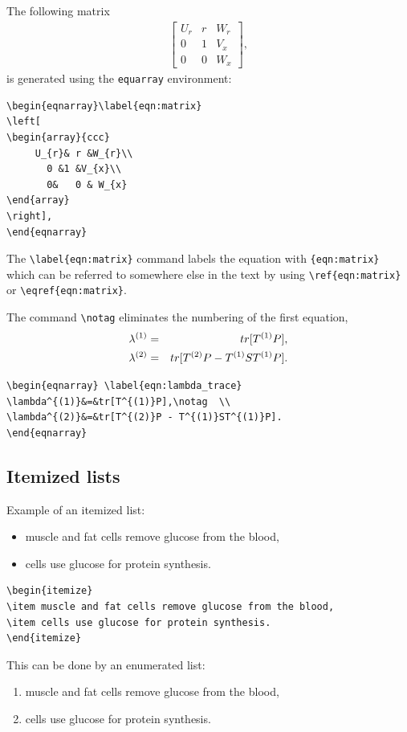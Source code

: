 \documentclass[11pt]{book}
\begin{document}
The following matrix 
\begin{eqnarray}\label{eqn:matrix}
\left[
\begin{array}{ccc}
	 U_{r}&     r       &   W_{r}	\\
	   0       &	1      &  V_{x}	\\
	   0	   &	0      &  W_{x}
\end{array}
\right], 
\end{eqnarray}
is generated using  the \verb+equarray+ environment:
\begin{verbatim}
\begin{eqnarray}\label{eqn:matrix}
\left[
\begin{array}{ccc}
	 U_{r}& r &W_{r}\\
	   0 &1 &V_{x}\\
	   0&	0 & W_{x}
\end{array}
\right], 
\end{eqnarray}
\end{verbatim}
The \verb+\label{eqn:matrix}+ command labels the equation with \verb+{eqn:matrix}+ which can 
be referred  to somewhere else in the text by using \verb+\ref{eqn:matrix}+ or  \verb+\eqref{eqn:matrix}+.


The command \verb+\notag+ eliminates the numbering of the first equation,
\begin{eqnarray} \label{eqn:lambda_trace}
\lambda^{(1)}&=&tr[T^{(1)}P],\notag  \\
\lambda^{(2)}&=&tr[T^{(2)}P - T^{(1)}ST^{(1)}P].
\end{eqnarray}
\begin{verbatim}
\begin{eqnarray} \label{eqn:lambda_trace}
\lambda^{(1)}&=&tr[T^{(1)}P],\notag  \\
\lambda^{(2)}&=&tr[T^{(2)}P - T^{(1)}ST^{(1)}P].
\end{eqnarray}
\end{verbatim}


\subsection{Itemized lists}
Example of an itemized list:
\begin{itemize}
\item muscle and fat cells remove glucose from the blood,
\item cells use glucose for protein synthesis.
\end{itemize}
\begin{verbatim}
\begin{itemize}
\item muscle and fat cells remove glucose from the blood,
\item cells use glucose for protein synthesis.
\end{itemize}
\end{verbatim}
This can be done by an enumerated  list:
\begin{enumerate}
\item muscle and fat cells remove glucose from the blood,
\item cells use glucose for protein synthesis.
\end{enumerate}
\end{document}
